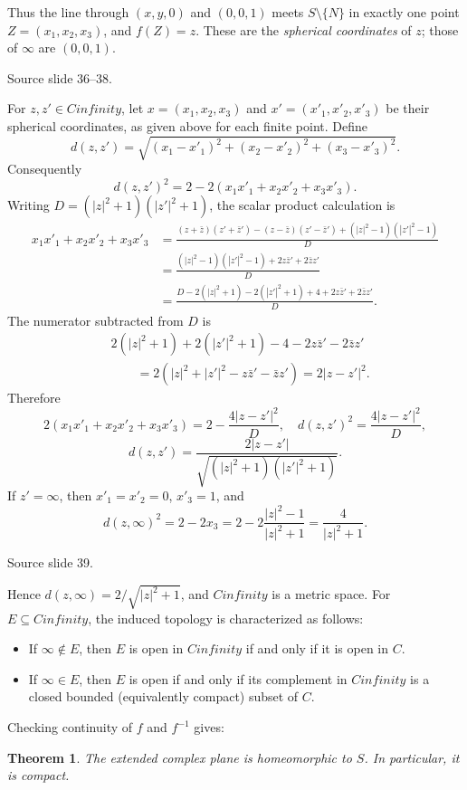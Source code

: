 \documentclass[10pt,letterpaper,twoside,openright]{amsbook}
\numberwithin{equation}{subsection}
\theoremstyle{sea-plain}
\newtheorem{theorem}[subsection]{Theorem}
\theoremstyle{sea-definition}
\theoremstyle{sea-exercise}
\newcommand{\RR}{\mathbb{R}}
\newcommand{\CC}{\mathbb{C}}
\newcommand{\DD}{\mathbb{D}}
\newcommand{\HH}{\mathbb{H}}
\newcommand{\Chat}{\mathbb{C}_{\infty}}
\def\CC{C}\def\RR{R}\def\DD{D}\def\HH{H}\def\Chat{C infinity}}
\newcommand{\src}[1]{\par\smallskip\noindent
 {\scriptsize\sffamily\color{SoftWhite}Source slide #1.}\par\nopagebreak\smallskip}
\begin{document}
Thus the line through $(x,y,0)$ and $(0,0,1)$ meets $S\setminus\{N\}$ in
exactly one point $Z=(x_1,x_2,x_3)$, and $f(Z)=z$.
These are the \emph{spherical coordinates} of $z$; those of $\infty$ are
$(0,0,1)$.
\src{36--38}
For $z,z'\in\Chat$, let $x=(x_1,x_2,x_3)$ and $x'=(x'_1,x'_2,x'_3)$
be their spherical coordinates, as given above for each finite point. Define
\[
 d(z,z')=\sqrt{(x_1-x'_1)^2+(x_2-x'_2)^2+(x_3-x'_3)^2}.
\]
Consequently
\[
 d(z,z')^2=2-2(x_1x'_1+x_2x'_2+x_3x'_3).
\]
Writing $D=(|z|^2+1)(|z'|^2+1)$, the scalar product calculation is
\[
\begin{aligned}
 x_1x'_1+x_2x'_2+x_3x'_3
 &=\frac{(z+\bar z)(z'+\bar z')-(z-\bar z)(z'-\bar z')
       +( |z|^2-1)(|z'|^2-1)}{D}\\
 &=\frac{(|z|^2-1)(|z'|^2-1)+2z\bar z'+2\bar z z'}{D}\\
 &=\frac{D-2(|z|^2+1)-2(|z'|^2+1)+4+2z\bar z'+2\bar z z'}{D}.
\end{aligned}
\]
The numerator subtracted from $D$ is
\[
\begin{aligned}
 &2(|z|^2+1)+2(|z'|^2+1)-4-2z\bar z'-2\bar z z'\\
 &\qquad=2(|z|^2+|z'|^2-z\bar z'-\bar z z')=2|z-z'|^2.
\end{aligned}
\]
Therefore
\[
 2(x_1x'_1+x_2x'_2+x_3x'_3)=2-\frac{4|z-z'|^2}{D},
\quad d(z,z')^2=\frac{4|z-z'|^2}{D},
\]
\[
 d(z,z')=\frac{2|z-z'|}{\sqrt{(|z|^2+1)(|z'|^2+1)}}.
\]
If $z'=\infty$, then $x'_1=x'_2=0$, $x'_3=1$, and
\[
 d(z,\infty)^2=2-2x_3
 =2-2\frac{|z|^2-1}{|z|^2+1}=\frac4{|z|^2+1}.
\]
\src{39}
Hence $d(z,\infty)=2/\sqrt{|z|^2+1}$, and $\Chat$ is a metric space.
For $E\subseteq\Chat$, the induced topology is characterized as follows:
\begin{itemize}
\item If $\infty\notin E$, then $E$ is open in $\Chat$ if and only if it is
open in $\CC$.
\item If $\infty\in E$, then $E$ is open if and only if its complement in
$\Chat$ is a closed bounded (equivalently compact) subset of $\CC$.
\end{itemize}
Checking continuity of $f$ and $f^{-1}$ gives:
\begin{theorem}
The extended complex plane is homeomorphic to $S$. In particular, it is compact.
\end{theorem}
\end{document}
